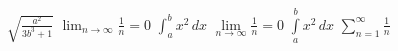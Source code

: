 $\sqrt{ \frac{a^2}{3b^3+1}}$
$\lim_{n \to \infty} \frac{1}{n}=0$
$\int^b_a x^2 \, dx$
$\lim \limits_{n \to \infty} \frac{1}{n}=0$
$\int \limits^b_a x^2 \, dx$
$\sum \limits^{\infty}_{n=1} \frac{1}{n}$

